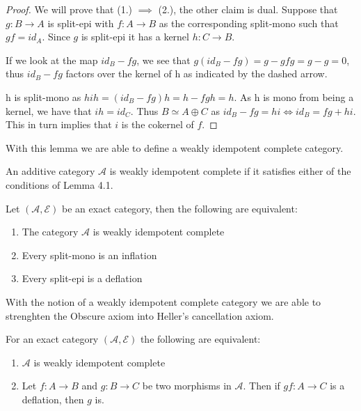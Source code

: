     \begin{proof}
        We will prove that (1.) $\implies$ (2.), the other claim is dual. Suppose that $g:B\rightarrow A$ is split-epi with $f:A\rightarrow B$ as the corresponding split-mono such that $gf=id_A$. Since $g$ is split-epi it has a kernel $h:C\rightarrow B$.
        
        \begin{center}
        \end{center}

        If we look at the map $id_B-fg$, we see that $g(id_B-fg)=g-gfg=g-g=0$, thus $id_B-fg$ factors over the kernel of h as indicated by the dashed arrow.

        h is split-mono as $hih = (id_B-fg)h=h-fgh=h$. As h is mono from being a kernel, we have that $ih=id_C$. Thus $B\simeq A\oplus C$ as $id_B -fg = hi \iff id_B = fg + hi$. This in turn implies that $i$ is the cokernel of $f$.
    \end{proof}

    With this lemma we are able to define a weakly idempotent complete category.

    \begin{definition}
        An additive category $\mathcal{A}$ is weakly idempotent complete if it satisfies either of the conditions of Lemma 4.1.
    \end{definition}

    \begin{corollary}
        Let $(\mathcal{A},\mathcal{E})$ be an exact category, then the following are equivalent:
        \begin{enumerate}
            \item The category $\mathcal{A}$ is weakly idempotent complete
            \item Every split-mono is an inflation
            \item Every split-epi is a deflation
        \end{enumerate}
    \end{corollary}

    With the notion of a weakly idempotent complete category we are able to strenghten the Obscure axiom into Heller's cancellation axiom.

    \begin{prop}
        For an exact category $(\mathcal{A},\mathcal{E})$ the following are equivalent:
        \begin{enumerate}
            \item $\mathcal{A}$ is weakly idempotent complete
            \item Let $f: A\rightarrow B$ and $g: B\rightarrow C$ be two morphisms in $\mathcal{A}$. Then if $gf:A\rightarrow C$ is a deflation, then $g$ is.
        \end{enumerate}
    \end{prop}


